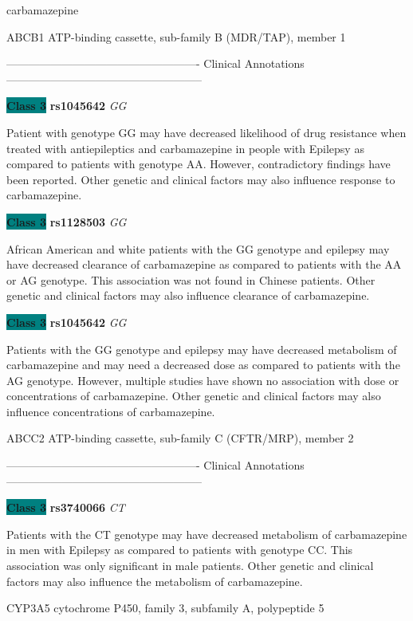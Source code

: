 \documentclass{resume} %
\begin{document}
\begin{rSection}{ carbamazepine }
\begin{rSubsection}{ ABCB1 }{ ATP-binding cassette, sub-family B (MDR/TAP), member 1 }{}{}
\item[] ---------------------------------------------------- Clinical Annotations -----------------------------------------------------\newline
\item \textbf{\colorbox{teal} {Class 3}} \textbf{ rs1045642 } \textit{ GG }
\item[] Patient with genotype GG may have decreased likelihood of drug resistance when treated with antiepileptics and carbamazepine in people with Epilepsy as compared to patients with genotype AA. However, contradictory findings have been reported. Other genetic and clinical factors may also influence response to carbamazepine.\item \textbf{\colorbox{teal} {Class 3}} \textbf{ rs1128503 } \textit{ GG }
\item[] African American and white patients with the GG genotype and epilepsy may have decreased clearance of carbamazepine as compared to patients with the AA or AG genotype. This association was not found in Chinese patients. Other genetic and clinical factors may also influence clearance of carbamazepine.\item \textbf{\colorbox{teal} {Class 3}} \textbf{ rs1045642 } \textit{ GG }
\item[] Patients with the GG genotype and epilepsy may have decreased metabolism of carbamazepine and may need a decreased dose as compared to patients with the AG genotype. However, multiple studies have shown no association with dose or concentrations of carbamazepine. Other genetic and clinical factors may also influence concentrations of carbamazepine.
\end{rSubsection}\begin{rSubsection}{ ABCC2 }{ ATP-binding cassette, sub-family C (CFTR/MRP), member 2 }{}{}
\item[]

\item[] ---------------------------------------------------- Clinical Annotations -----------------------------------------------------\newline
\item \textbf{\colorbox{teal} {Class 3}} \textbf{ rs3740066 } \textit{ CT }
\item[] Patients with the CT genotype may have decreased metabolism of carbamazepine in men with Epilepsy as compared to patients with genotype CC. This association was only significant in male patients. Other genetic and clinical factors may also influence the metabolism of carbamazepine.
\end{rSubsection}\begin{rSubsection}{ CYP3A5 }{ cytochrome P450, family 3, subfamily A, polypeptide 5 }{}{}
\item[]


\end{rSubsection}
\end{rSection}
\end{document}
